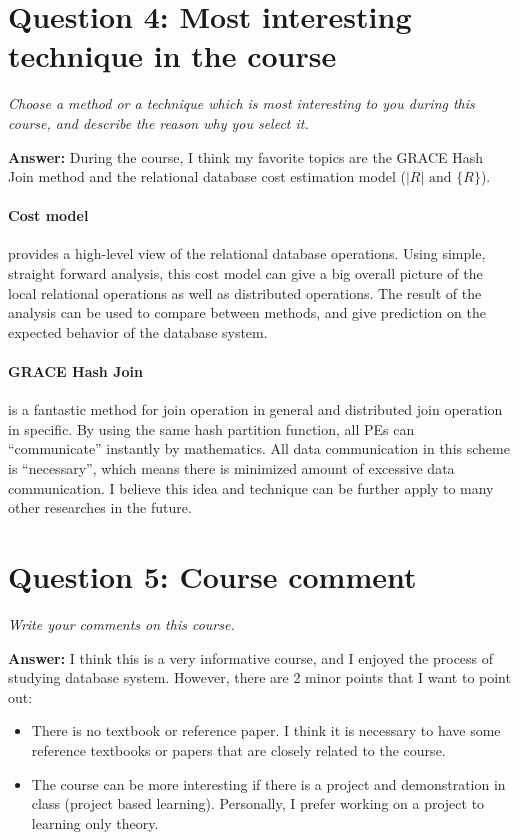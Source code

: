 \documentclass[a4paper,12pt]{article}
\begin{document}
\section*{Question 4: Most interesting technique in the course}
\setcounter{section}{1}

\textit{Choose a method or a technique which is most interesting to you during this course, and describe the reason why you select it.} 

\vspace{1.5em}
\noindent
\textbf{Answer:} 
\noindent
During the course, I think my favorite topics are the GRACE Hash Join method and the relational database cost estimation model ($|R| \mbox{ and } \{R\}$).
\paragraph{Cost model} provides a high-level view of the relational database operations. Using simple, straight forward analysis, this cost model can give a big overall picture of the local relational operations as well as distributed operations. The result of the analysis can be used to compare between methods, and give prediction on the expected behavior of the database system. 
\paragraph{GRACE Hash Join} is a fantastic method for join operation in general and distributed join operation in specific. By using the same hash partition function, all PEs can ``communicate'' instantly by mathematics. All data communication in this scheme is ``necessary'', which means there is minimized amount of excessive data communication. I believe this idea and technique can be further apply to many other researches in the future.




\section*{Question 5: Course comment}
\setcounter{section}{1}

\textit{Write your comments on this course.} 

\vspace{1.5em}
\noindent
\textbf{Answer:} 
\noindent
I think this is a very informative course, and I enjoyed the process of studying database system. However, there are 2 minor points that I want to point out:
\begin{itemize}
    \setlength{\parskip}{0cm}
    \setlength{\itemsep}{0cm}
    \item There is no textbook or reference paper. I think it is necessary to have some reference textbooks or papers that are closely related to the course.
    \item The course can be more interesting if there is a project and demonstration in class (project based learning). Personally, I prefer working on a project to learning only theory.
\end{itemize}



\end{document}
